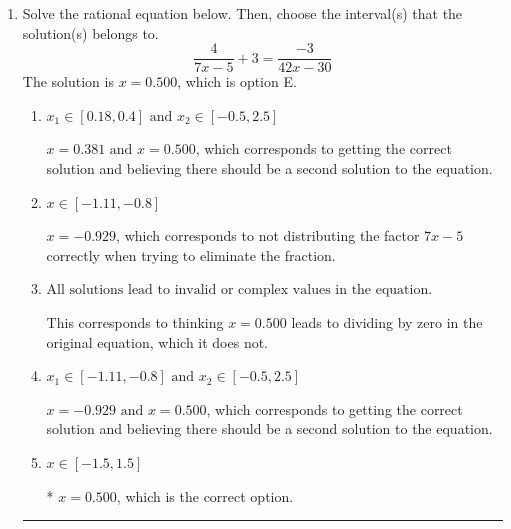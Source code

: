 \documentclass{extbook}[14pt]
\newcommand{\litem}[1]{\item #1

\rule{\textwidth}{0.4pt}}
\begin{document}
\begin{enumerate}\litem{
Solve the rational equation below. Then, choose the interval(s) that the solution(s) belongs to.
\[ \frac{4}{7x -5} + 3 = \frac{-3}{42x -30} \]The solution is \( x = 0.500 \), which is option E.\begin{enumerate}[label=\Alph*.]
\item \( x_1 \in [0.18, 0.4] \text{ and } x_2 \in [-0.5,2.5] \)

$x = 0.381 \text{ and } x = 0.500$, which corresponds to getting the correct solution and believing there should be a second solution to the equation.
\item \( x \in [-1.11,-0.8] \)

$x = -0.929$, which corresponds to not distributing the factor $7x -5$ correctly when trying to eliminate the fraction.
\item \( \text{All solutions lead to invalid or complex values in the equation.} \)

This corresponds to thinking $x = 0.500$ leads to dividing by zero in the original equation, which it does not.
\item \( x_1 \in [-1.11, -0.8] \text{ and } x_2 \in [-0.5,2.5] \)

$x = -0.929 \text{ and } x = 0.500$, which corresponds to getting the correct solution and believing there should be a second solution to the equation.
\item \( x \in [-1.5,1.5] \)

* $x = 0.500$, which is the correct option.
\end{enumerate}

}
\end{enumerate}
\end{document}
